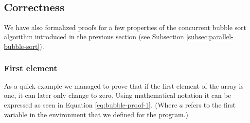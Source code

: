 \begin{code}
    \>[2]\AgdaSpace{}%
    \AgdaSymbol{:}\AgdaSpace{}%
    \AgdaSymbol{(}\AgdaSpace{}%
    \AgdaOperator{\AgdaFunction{▷[}}\AgdaSpace{}%
    \AgdaSpace{}%
    \AgdaSpace{}%
    \AgdaSpace{}%
    \AgdaOperator{\AgdaFunction{]}}\AgdaSpace{}%
    \AgdaSymbol{)}\AgdaSpace{}%
    \AgdaSpace{}%
    \AgdaSymbol{(}\AgdaSpace{}%
    \AgdaOperator{\AgdaFunction{▷[}}\AgdaSpace{}%
    \AgdaSpace{}%
    \AgdaOperator{\AgdaFunction{]}}\AgdaSpace{}%
    \AgdaSpace{}%
    \AgdaSpace{}%
    \AgdaSpace{}%
    \AgdaOperator{\AgdaFunction{▷[}}\AgdaSpace{}%
    \AgdaSpace{}%
    \AgdaOperator{\AgdaFunction{]}}\AgdaSpace{}%
    \AgdaSymbol{)}\<%
    \\
    \>[2]\AgdaSpace{}%
    \AgdaSymbol{=}\AgdaSpace{}%
    \AgdaSpace{}%
    \AgdaSpace{}%
    \AgdaSpace{}%
    \AgdaSymbol{((}\AgdaSpace{}%
    \AgdaSymbol{)}\AgdaSpace{}%
    \AgdaOperator{\AgdaInductiveConstructor{,}}\AgdaSpace{}%
    \AgdaSymbol{(}\AgdaSpace{}%
    \AgdaSymbol{)))}\AgdaSpace{}%
    \AgdaOperator{\AgdaInductiveConstructor{,}}\AgdaSpace{}%
    \<%
\end{code}

\subsection{Correctness}

We have also formalized proofs for a few properties of the concurrent bubble sort algorithm introduced in the previous section (see Subsection \ref{subsec:parallel-bubble-sort}).

\subsubsection{First element}

As a quick example we managed to prove that if the first element of the array is one, it can later only change to zero. Using mathematical notation it can be expressed as seen in Equation \ref{eq:bubble-proof-1}. (Where $a$ refers to the first variable in the environment that we defined for the program.)

